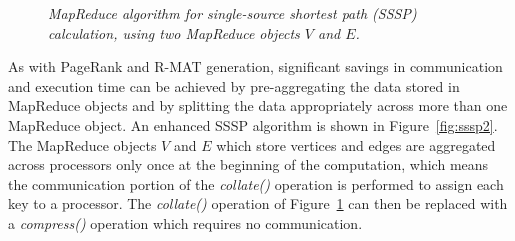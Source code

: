 \begin{figure}[htb]
 \begin{center}\end{center}

 \caption{\it MapReduce algorithm for single-source shortest path
 (SSSP) calculation, using two MapReduce objects $V$ and $E$.}

 \label{fig:sssp}
\end{figure}

As with PageRank and R-MAT generation, significant savings in
communication and execution time can be achieved by pre-aggregating
the data stored in MapReduce objects and by splitting the data
appropriately across more than one MapReduce object.  An enhanced SSSP
algorithm is shown in Figure~\ref{fig:sssp2}.  The MapReduce objects
$V$ and $E$ which store vertices and edges are aggregated across
processors only once at the beginning of the computation, which means
the communication portion of the {\it collate()} operation is
performed to assign each key to a processor.  The {\it collate()}
operation of Figure~\ref{fig:sssp} can then be replaced with a {\it
compress()} operation which requires no communication.

